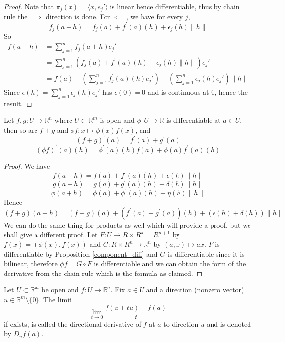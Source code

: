 \begin{proof}
    Note that $\pi_j(x)=\langle x,e_j'\rangle$ is linear hence differentiable, thus by chain rule the $\implies$ direction is done.
    For $\impliedby$, we have for every $j$,
    $$f_j(a+h)=f_j(a)+f^\prime(a)(h)+\epsilon_j(h)\|h\|$$
    So
    \begin{align*}
        f(a+h)&=\sum_{j=1}^nf_j(a+h)e_j'\\
        &=\sum_{j=1}^n(f_j(a)+f^\prime(a)(h)+\epsilon_j(h)\|h\|)e_j'\\
        &=f(a)+\left( \sum_{j=1}^nf_j^\prime(a)(h)e_j' \right)+\left( \sum_{j=1}^n\epsilon_j(h)e_j' \right)\|h\|
    \end{align*}
    Since $\epsilon(h)=\sum_{j=1}^n\epsilon_j(h)e_j'$ has $\epsilon(0)=0$ and is continuous at $0$, hence the result.
\end{proof}
\begin{proposition}
    Let $f,g:U\to\mathbb R^n$ where $U\subset\mathbb R^m$ is open and $\phi:U\to\mathbb R$ is differentiable at $a\in U$, then so are $f+g$ and $\phi f:x\mapsto \phi(x)f(x)$, and
    $$(f+g)^\prime(a)=f^\prime(a)+g^\prime(a)$$
    $$(\phi f)^\prime(a)(h)=\phi^\prime(a)(h)f(a)+\phi(a)f^\prime(a)(h)$$
\end{proposition}
\begin{proof}
    We have
    $$f(a+h)=f(a)+f^\prime(a)(h)+\epsilon(h)\|h\|$$
    $$g(a+h)=g(a)+g^\prime(a)(h)+\delta(h)\|h\|$$
    $$\phi(a+h)=\phi(a)+\phi^\prime(a)(h)+\eta(h)\|h\|$$
    Hence
    $$(f+g)(a+h)=(f+g)(a)+(f^\prime(a)+g^\prime(a))(h)+(\epsilon(h)+\delta(h))\|h\|$$
    We can do the same thing for products as well which will provide a proof, but we shall give a different proof.
    Let $F:U\to R\times R^n=R^{n+1}$ by $f(x)=(\phi(x),f(x))$ and $G:R\times R^n\to\mathbb R^n$ by $(a,x)\mapsto ax$.
    $F$ is differentiable by Proposition \ref{component_diff} and $G$ is differentiable since it is bilinear, therefore $\phi f=G\circ F$ is differentiable and we can obtain the form of the derivative from the chain rule which is the formula as claimed.
\end{proof}
\begin{definition}
    Let $U\subset\mathbb R^m$ be open and $f:U\to\mathbb R^n$.
    Fix $a\in U$ and a direction (nonzero vector) $u\in\mathbb R^m\setminus\{0\}$.
    The limit
    $$\lim_{t\to 0}\frac{f(a+tu)-f(a)}{t}$$
    if exists, is called the directional derivative of $f$ at $a$ to direction $u$ and is denoted by $D_uf(a)$.
\end{definition}
